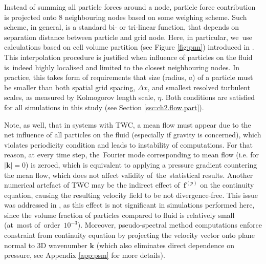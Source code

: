 \documentclass{pracamgren}
\begin{document}
Instead of summing all particle forces around a node, particle force contribution is projected onto $8$ neighbouring nodes based on some weighing scheme.
Such scheme, in general, is a standard bi- or tri-linear function, that depends on separation distance between particle and grid node.
Here, in particular, we~use calculations based on cell volume partition (see Figure \ref{fig:pnn}) introduced in \textcite{Squires1990}.
This interpolation procedure is justified when influence of particles on the fluid is~indeed highly localised and limited to the closest neighbouring nodes.
In practice, this takes form of requirements that size (radius, $a$) of a particle must be smaller than both spatial grid spacing, $\Delta x$, and smallest resolved turbulent scales, as measured by Kolmogorov length scale, $\eta$.
Both conditions are satisfied for all simulations in this study (see Section \ref{ssc:ch2.flow.part}).

Note, as well, that in systems with TWC, a mean flow must appear due to the net influence of all particles on the fluid (especially if gravity is concerned), which violates periodicity condition and leads to instability of computations.
For that reason, at every time step, the~Fourier mode corresponding to mean flow (i.e. for $|\mathbf{k}| = 0$) is zeroed, which is equivalent to applying a pressure gradient countering the mean flow, which does not affect validity of~the~statistical results.
Another numerical artefact of TWC may be the indirect effect of~$\textbf{f}^{(p)}$ on the continuity equation, causing the resulting velocity field to be not divergence-free.
This issue was addressed in \textcite{Rosa2020}, as this effect is not significant in simulations performed here, since the volume fraction of particles compared to fluid is relatively small (at~most of~order~$10^{-3}$).
Moreover, pseudo-spectral method computations enforce constraint from continuity equation by projecting the velocity vector onto plane normal to 3D wavenumber $\mathbf{k}$ (which also eliminates direct dependence on pressure, see Appendix \ref{app:psm} for more details).
\end{document}
